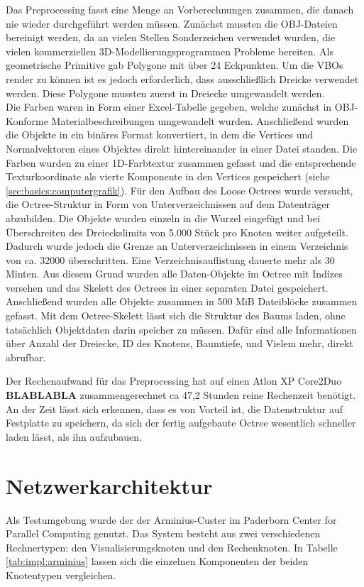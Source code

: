 Das Preprocessing fasst eine Menge an Vorberechnungen zusammen, die danach nie wieder durchgeführt werden müssen. Zunächst mussten die OBJ-Dateien bereinigt werden, da an vielen Stellen Sonderzeichen verwendet wurden, die vielen kommerziellen 3D-Modellierungsprogrammen Probleme bereiten. Als geometrische Primitive gab Polygone mit über 24 Eckpunkten. Um die VBOs render zu können ist es jedoch erforderlich, dass ausschließlich Dreicke verwendet werden. Diese Polygone mussten zuerst in Dreiecke umgewandelt werden. \\
Die Farben waren in Form einer Excel-Tabelle gegeben, welche zunächst in OBJ-Konforme Materialbeschreibungen umgewandelt wurden. Anschließend wurden die Objekte in ein binäres Format konvertiert, in dem die Vertices und Normalvektoren eines Objektes direkt hintereinander in einer Datei standen. Die Farben wurden zu einer 1D-Farbtextur zusammen gefasst und die entsprechende Texturkoordinate als vierte Komponente in den Vertices gespeichert (siehe \ref{sec:basics:computergrafik}). Für den Aufbau des Loose Octrees wurde versucht, die Octree-Struktur in Form von Unterverzeichnissen auf dem Datenträger abzubilden. Die Objekte wurden einzeln in die Wurzel eingefügt und bei Überschreiten des Dreieckslimits von 5.000 Stück pro Knoten weiter aufgeteilt. Dadurch wurde jedoch die Grenze an Unterverzeichnissen in einem Verzeichnis von ca. 32000 überschritten. Eine Verzeichnisauflistung dauerte mehr als 30 Minten. Aus diesem Grund wurden alle Daten-Objekte im Octree mit Indizes versehen und das Skelett des Octrees in einer separaten Datei gespeichert. Anschließend wurden alle Objekte zusammen in 500 MiB Dateiblöcke zusammen gefasst. Mit dem Octree-Skelett lässt sich die Struktur des Baums laden, ohne tatsächlich Objektdaten darin speicher zu müssen. Dafür sind alle Informationen über Anzahl der Dreiecke, ID des Knotens, Baumtiefe, und Vielem mehr, direkt abrufbar.

Der Rechenaufwand für das Preprocessing hat auf einen Atlon XP Core2Duo \textbf{BLABLABLA} zusammengerechnet ca 47,2 Stunden reine Rechenzeit benötigt. An der Zeit lässt sich erkennen, dass es von Vorteil ist, die Datenstruktur auf Festplatte zu speichern, da sich der fertig aufgebaute Octree wesentlich schneller laden lässt, als ihn aufzubauen.

\section{Netzwerkarchitektur}
\label{sec:impl:netzwerkarchitektur}
%
Als Testumgebung wurde der der Arminius-Custer im Paderborn Center for Parallel Computing \cite{pc2} genutzt. Das System besteht aus zwei verschiedenen Rechnertypen: den Visualisierungsknoten und den Rechenknoten. In Tabelle \ref{tab:impl:arminius} lassen sich die einzelnen Komponenten der beiden Knotentypen vergleichen. 

